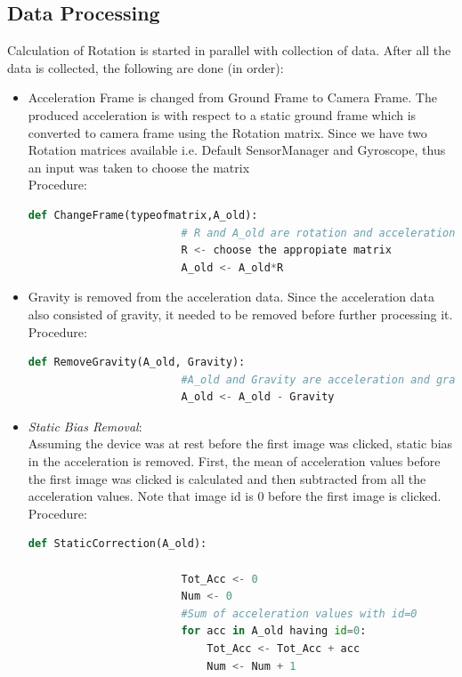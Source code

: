 \documentclass{article}
\begin{document}
			\subsection{Data Processing} Calculation of Rotation is started in parallel with collection of data. After all the data is collected, the following are done (in order):
				\begin{itemize}
				\item Acceleration Frame is changed from Ground Frame to Camera Frame. The produced acceleration is with respect to a static ground frame which is converted to camera frame using the Rotation matrix. Since we have two Rotation matrices available i.e. Default SensorManager and Gyroscope, thus an input was taken to choose the matrix
				\\ Procedure:
				\begin{lstlisting}[language=Python, caption=ChangeFrame()]
					def ChangeFrame(typeofmatrix,A_old):
						# R and A_old are rotation and acceleration matrices respectively
						R <- choose the appropiate matrix
						A_old <- A_old*R
				\end{lstlisting}
				\item Gravity is removed from the acceleration data. Since the acceleration data also consisted of gravity, it needed to be removed before further processing it.
				\\ Procedure:
				\begin{lstlisting}[language=Python, caption=RemoveGravity()]
					def RemoveGravity(A_old, Gravity):
						#A_old and Gravity are acceleration and gravity matrices respectively
						A_old <- A_old - Gravity
				\end{lstlisting}
				\item \textit{Static Bias Removal}:\\Assuming the device was at rest before the first image was clicked, static bias in the acceleration is removed. First, the mean of acceleration values before the first image was clicked is calculated and then subtracted from all the acceleration values. Note that image id is 0 before the first image is clicked.
				\\ Procedure:
				\begin{lstlisting}[language=Python, caption=StaticCorrection()]
					def StaticCorrection(A_old):

						Tot_Acc <- 0
						Num <- 0
						#Sum of acceleration values with id=0
						for acc in A_old having id=0:
							Tot_Acc <- Tot_Acc + acc
							Num <- Num + 1


\end{lstlisting}
\end{itemize}
\end{document}
